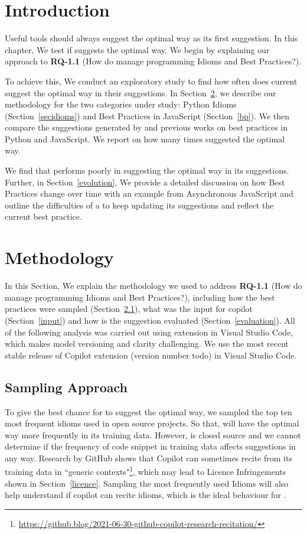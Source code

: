 \label{chapter:idioms}

\section{Introduction}
Useful \AISE{} tools should always suggest the optimal way as its first suggestion. In this chapter, We test if \cop{} suggests the optimal way. 
We begin by explaining our approach to \textbf{RQ-1.1} (How do \cct{} manage programming Idioms and Best Practices?). 

To achieve this, We conduct an exploratory study to find how often does current \cct{} suggest the optimal way in their suggestions. In Section~\ref{methodology}, we describe our methodology for the two categories under study: Python Idioms (Section~\ref{secidioms}) and Best Practices in JavaScript (Section~\ref{bp}).
We then compare the suggestions generated by \cop{} and previous works on best practices in Python and JavaScript. We report on how many times \cop{} suggested the optimal way. 

We find that \cop{} performs poorly in suggesting the optimal way in its suggestions. Further, in Section~\ref{evolution}, We provide a detailed discussion on how Best Practices change over time with an example from Asynchronous JavaScript and outline the difficulties of a \cct{} to keep updating its suggestions and reflect the current best practice.

\section{Methodology}
\label{methodology}
In this Section, We explain the methodology we used to address \textbf{RQ-1.1} (How do \cct{} manage programming Idioms and Best Practices?), including how the best practices were sampled (Section~\ref{sampling}), what was the input for copilot (Section~\ref{input}) and how is the suggestion evaluated (Section~\ref{evaluation}). All of the following analysis was carried out using \cop{} extension in Visual Studio Code, which makes \cop{} model versioning and clarity challenging. We use the most recent stable release of Copilot extension (version number todo) in Visual Studio Code.

\subsection{Sampling Approach}
\label{sampling}
To give the best chance for \cop{} to suggest the optimal way, we sampled the top ten most frequent idioms used in open source projects. So that, \cop{} will have the optimal way more frequently in its training data. However, \cop{} is closed source and we cannot determine if the frequency of code snippet in training data affects \cop{} suggestions in any way. Research by GitHub shows that Copilot can sometimes recite from its training data in ``generic contexts"\footnote{\url{https://github.blog/2021-06-30-github-copilot-research-recitation/}}, which may lead to Licence Infringements shown in Section~\ref{licence}. Sampling the most frequently used Idioms will also help understand if copilot can recite idioms, which is the ideal behaviour for \cct{}.

